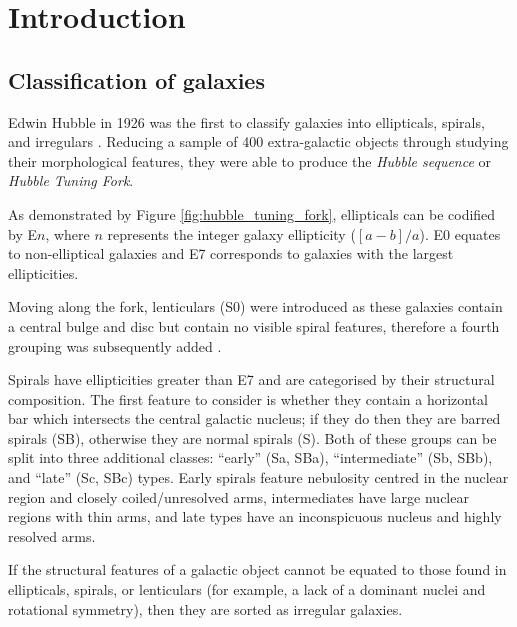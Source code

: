 \documentclass[12pt, twocolumn]{revtex4-1}    %
\begin{document}

\null\newpage
\null\newpage
\tableofcontents
\newpage

\section{Introduction} 
\subsection{Classification of galaxies}
\noindent
Edwin Hubble in 1926 was the first to classify galaxies into ellipticals, spirals, and irregulars \citep{1926ApJ....64..321H}. Reducing a sample of 400 extra-galactic objects through studying their morphological features, they were able to produce the \textit{Hubble sequence} or \textit{Hubble Tuning Fork}.

As demonstrated by Figure \ref{fig:hubble_tuning_fork}, ellipticals can be codified by E$n$, where $n$ represents the integer galaxy ellipticity ($[a-b]/a$). E0 equates to non-elliptical galaxies and E7 corresponds to galaxies with the largest ellipticities. 

Moving along the fork, lenticulars (S0) were introduced as these galaxies contain a central bulge and disc but contain no visible spiral features, therefore a fourth grouping was subsequently added \citep{1961hag..book.....S, 1975gaun.book....1S, 1994cag..book.....S}. 

Spirals have ellipticities greater than E7 and are categorised by their structural composition. The first feature to consider is whether they contain a horizontal bar which intersects the central galactic nucleus; if they do then they are barred spirals (SB), otherwise they are normal spirals (S). Both of these groups can be split into three additional classes: ``early'' (Sa, SBa), ``intermediate'' (Sb, SBb), and ``late'' (Sc, SBc) types. Early spirals feature nebulosity centred in the nuclear region and closely coiled/unresolved arms, intermediates have large nuclear regions with thin arms, and late types have an inconspicuous nucleus and highly resolved arms.  

If the structural features of a galactic object cannot be equated to those found in ellipticals, spirals, or lenticulars (for example, a lack of a dominant nuclei and rotational symmetry), then they are sorted as irregular galaxies.
\end{document}
